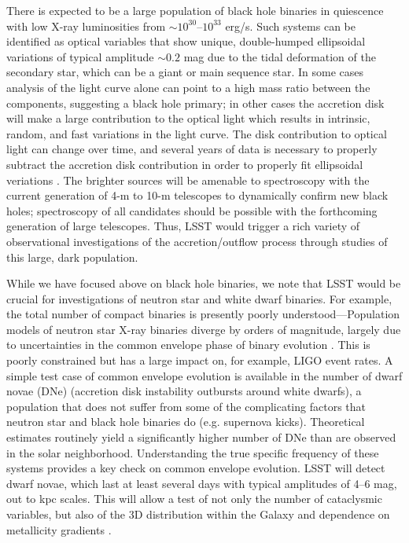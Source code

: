 There is expected to be a large population of black hole binaries in quiescence
with low X-ray luminosities from $\sim 10^{30}$--$10^{33}$ erg/s.
Such systems can be identified as optical variables that show unique,
double-humped ellipsoidal variations of typical amplitude $\sim 0.2$
mag due to the tidal deformation of the secondary star, which can be a
giant or main sequence star. In some cases analysis of the light curve
alone can point to a high mass ratio between the components,
suggesting a black hole primary; in other cases the accretion disk
will make a large contribution to the optical light which results in
intrinsic, random, and fast variations in the light curve. The disk
contribution to optical light can change over time, and several years
of data is necessary to properly subtract the accretion disk
contribution in order to properly fit ellipsoidal veriations
\citep{2010ApJ...710.1127C}.
The brighter sources will be amenable to spectroscopy
with the current generation of 4-m to 10-m telescopes to dynamically
confirm new black holes; spectroscopy of all candidates should be
possible with the forthcoming generation of large telescopes. Thus,
LSST would trigger a rich variety of observational investigations of
the accretion/outflow process through studies of this large, dark
population.

While we have focused above on black hole binaries, we note that LSST would be
crucial for investigations of neutron star and white dwarf binaries. For
example, the total number of compact binaries is presently poorly
understood---Population models of neutron star X-ray binaries diverge by orders
of magnitude, largely due to uncertainties in the common envelope phase of
binary evolution
\citep[e.g.,][]{2003ApJ...597.1036P,2006MNRAS.369.1152K,2015A&A...579A..33V}.
This is poorly constrained but has a large impact on, for example,
LIGO event rates. A simple test case of common envelope evolution is available
in the number of dwarf novae (DNe) (accretion disk instability outbursts around
white dwarfs), a population that does not suffer from some of the complicating
factors that neutron star and black hole binaries do (e.g. supernova kicks).
Theoretical estimates routinely yield a significantly higher number of DNe than
are observed in the solar neighborhood. Understanding the true specific
frequency of these systems provides a key check on common envelope evolution.
LSST will detect dwarf novae, which last at least several days with typical
amplitudes of 4--6 mag, out to kpc scales. This will allow a test of not only
the number of cataclysmic variables, but also of the 3D distribution within the
Galaxy and dependence on metallicity gradients \citep{2015MNRAS.448.3455B}.

